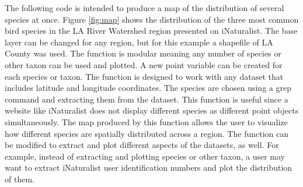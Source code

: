 \documentclass[letterpaper]{article}
\begin{document}
\newpage

The following code is intended to produce a map of the distribution of several species at once. Figure \ref{fig:map} shows the distribution of the three most common bird species in the LA River Watershed region presented on iNaturalist. The base layer can be changed for any region, but for this example a shapefile of LA County was used. The function is modular meaning any number of species or other taxon can be used and plotted. A new point variable can be created for each species or taxon. The function is designed to work with any dataset that includes latitude and longitude coordinates. The species are chosen using a grep command and extracting them from the dataset. This function is useful since a website like iNaturalist does not display different species as different point objects simultaneously. The map produced by this function allows the user to visualize how different species are spatially distributed across a region. The function can be modified to extract and plot different aspects of the datasets, as well. For example, instead of extracting and plotting species or other taxon, a user may want to extract iNaturalist user identification numbers and plot the distribution of them.
\end{document}
